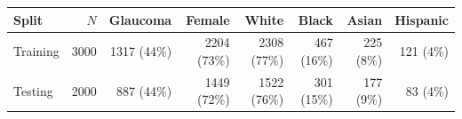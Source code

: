 \begin{tabular}{lrrrrrrr}
\toprule
 Split & $N$ & Glaucoma & Female & White & Black & Asian & Hispanic \\
\midrule
Training & 3000 & 1317 (44\%) & 2204 (73\%) & 2308 (77\%) & 467 (16\%) & 225 (8\%) & 121 (4\%) \\
Testing & 2000 & 887 (44\%) & 1449 (72\%) & 1522 (76\%) & 301 (15\%) & 177 (9\%) & 83 (4\%) \\
\bottomrule
\end{tabular}
